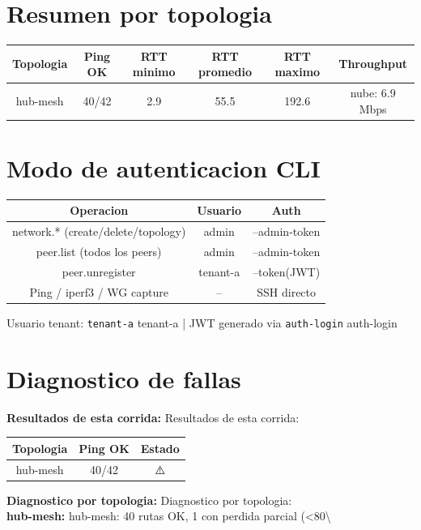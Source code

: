 \documentclass[11pt,a4paper]{article}
\begin{document}
\section{Resumen por topologia}
\begin{longtable}{|c|c|c|c|c|c|}
\hline
Topologia & Ping OK & RTT minimo & RTT promedio & RTT maximo & Throughput \\ \hline
hub-mesh & 40/42 & 2.9 & 55.5 & 192.6 & nube: 6.9 Mbps \\ \hline
\end{longtable}

\section{Modo de autenticacion CLI}
\begin{longtable}{|c|c|c|}
\hline
Operacion & Usuario & Auth \\ \hline
network.* (create/delete/topology) & admin & --admin-token \\ \hline
peer.list (todos los peers) & admin & --admin-token \\ \hline
peer.unregister & tenant-a & --token(JWT) \\ \hline
Ping / iperf3 / WG capture & -- & SSH directo \\ \hline
\end{longtable}

Usuario tenant:  \texttt{tenant-a} tenant-a  | JWT generado via  \texttt{auth-login} auth-login\\

\section{Diagnostico de fallas}
\textbf{Resultados de esta corrida:} Resultados de esta corrida:\\

\begin{longtable}{|c|c|c|}
\hline
Topologia & Ping OK & Estado \\ \hline
hub-mesh & 40/42 & ⚠️ \\ \hline
\end{longtable}

\textbf{Diagnostico por topologia:} Diagnostico por topologia:\\

\textbf{hub-mesh:} hub-mesh:  40 rutas OK, 1 con perdida parcial (<80\textbackslash{}%
\end{document}
